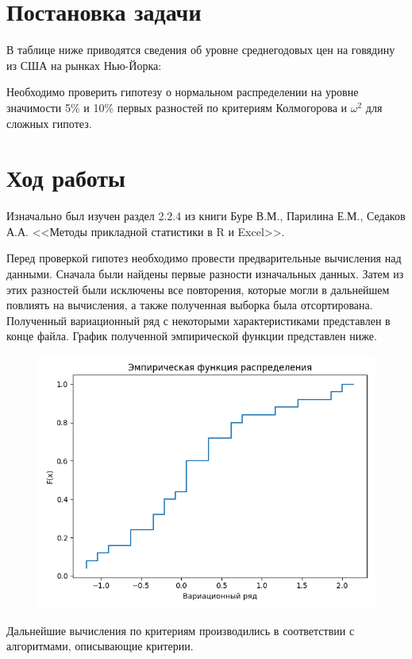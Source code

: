 \section{Постановка задачи}

В таблице ниже приводятся сведения об уровне среднегодовых цен на говядину из США на рынках Нью-Йорка:


Необходимо проверить гипотезу о нормальном распределении на уровне значимости 5\% и 10\% первых разностей по критериям Колмогорова и $\omega^2$ для сложных гипотез.

\section{Ход работы}

Изначально был изучен раздел 2.2.4 из книги Буре В.М., Парилина Е.М., Седаков А.А. <<Методы прикладной статистики в R и Excel>>.

Перед проверкой гипотез необходимо провести предварительные вычисления над данными. Сначала были найдены первые разности изначальных данных. Затем из этих разностей были исключены все повторения, которые могли в дальнейшем повлиять на вычисления, а также полученная выборка была отсортирована. Полученный вариационный ряд с некоторыми характеристиками представлен в конце файла. График полученной эмпирической функции представлен ниже.

\begin{figure}[H]
	\begin{minipage}[H]{\linewidth}
		\begin{center}
			\includegraphics[width=\linewidth]{figures/ecdf}
		\end{center}
	\end{minipage}
\end{figure}

Дальнейшие вычисления по критериям производились в соответствии с алгоритмами, описывающие критерии.



